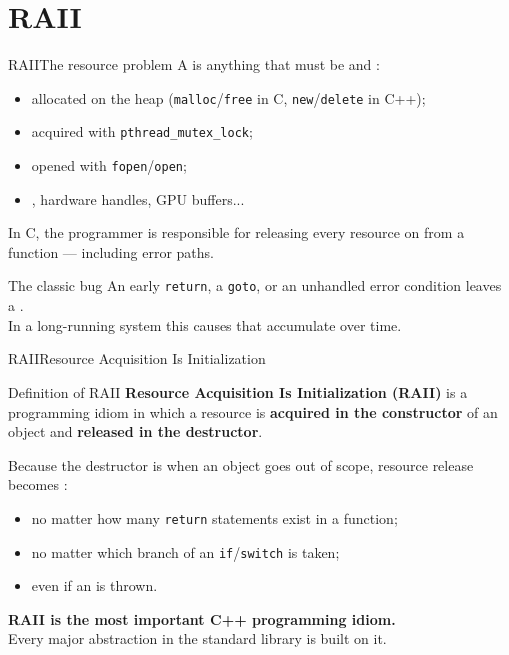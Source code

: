 
\section{RAII}
\graphicspath{{figs/section3/}}

\begin{frame}{RAII}{The resource problem}
	\justifying
	A  is anything that must be  and :
	\begin{itemize}
		\item {} allocated on the heap (\texttt{malloc}/\texttt{free} in C, \texttt{new}/\texttt{delete} in C++);
		\item {} acquired with \texttt{pthread\_mutex\_lock};
		\item {} opened with \texttt{fopen}/\texttt{open};
		\item {}, hardware handles, GPU buffers...
	\end{itemize}
	\bigskip
	In C, the programmer is responsible for releasing every resource on  from a function — including error paths.\\
	\bigskip
	\begin{alertblock}{The classic bug}
		\justifying
		An early \texttt{return}, a \texttt{goto}, or an unhandled error condition leaves a .\\
		In a long-running system this causes  that accumulate over time.
	\end{alertblock}
\end{frame}
\begin{frame}{RAII}{Resource Acquisition Is Initialization}
	\begin{block}{Definition of RAII}
		\justifying
		\textbf{Resource Acquisition Is Initialization (RAII)} is a programming idiom in which a resource is \textbf{acquired in the constructor} of an object and \textbf{released in the destructor}.
	\end{block}
	\justifying
	\bigskip
	Because the destructor is  when an object goes out of scope, resource release becomes :
	\begin{itemize}
		\item no matter how many \texttt{return} statements exist in a function;
		\item no matter which branch of an \texttt{if}/\texttt{switch} is taken;
		\item even if an  is thrown.
	\end{itemize}
	\bigskip
	\begin{block}{}
		\centering
		\textbf{RAII is the most important C++ programming idiom.}\\
		Every major abstraction in the standard library is built on it.
	\end{block}
\end{frame}
